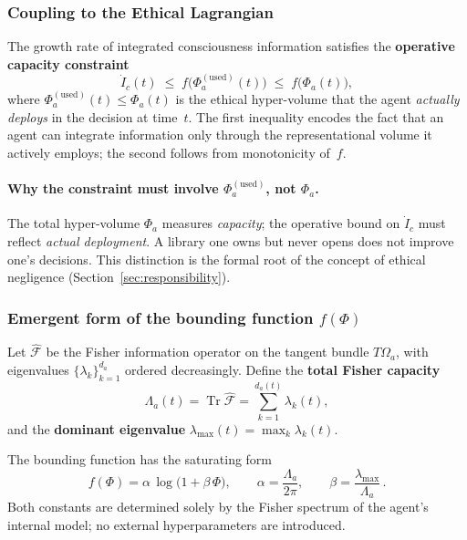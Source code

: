 \subsubsection{Coupling to the Ethical Lagrangian}
\label{sec:coupling}

The growth rate of integrated consciousness information satisfies the
\textbf{operative capacity constraint}
\begin{equation}
\label{eq:capacity-chain}
    \dot{I}_c(t)
    \;\leq\;
    f\!\bigl(\Phi_a^{(\mathrm{used})}(t)\bigr)
    \;\leq\;
    f\!\bigl(\Phi_a(t)\bigr),
\end{equation}
where $\Phi_a^{(\mathrm{used})}(t)\leq\Phi_a(t)$ is the ethical hyper-volume
that the agent \emph{actually deploys} in the decision at time~$t$.
The first inequality encodes the fact that an agent can integrate
information only through the representational volume it actively
employs; the second follows from monotonicity of~$f$.

\paragraph{Why the constraint must involve $\Phi_a^{(\mathrm{used})}$, not $\Phi_a$.}
The total hyper-volume $\Phi_a$ measures \emph{capacity};
the operative bound on $\dot{I}_c$ must reflect \emph{actual deployment}.
A library one owns but never opens does not improve one's decisions.
This distinction is the formal root of the concept of ethical negligence
(Section~\ref{sec:responsibility}).

\subsubsection{Emergent form of the bounding function $f(\Phi)$}
\label{sec:f-derivation}

Let $\hat{\mathcal{F}}$ be the Fisher information operator on the
tangent bundle $T\Omega_a$, with eigenvalues $\{\lambda_k\}_{k=1}^{d_a}$
ordered decreasingly.  Define the \textbf{total Fisher capacity}
\begin{equation}
    \Lambda_a(t)=\operatorname{Tr}\hat{\mathcal{F}}
    =\sum_{k=1}^{d_a(t)}\lambda_k(t),
\end{equation}
and the \textbf{dominant eigenvalue} $\lambda_{\max}(t)=\max_k\lambda_k(t)$.

\begin{proposition}
\label{prop:f-form}
The bounding function has the saturating form
\begin{equation}
\label{eq:f-form}
\boxed{\;
    f(\Phi)=\alpha\,\log\!\bigl(1+\beta\,\Phi\bigr),
    \qquad
    \alpha=\frac{\Lambda_a}{2\pi},
    \qquad
    \beta=\frac{\lambda_{\max}}{\Lambda_a}\,.
\;}
\end{equation}
Both constants are determined solely by the Fisher spectrum of the
agent's internal model; no external hyperparameters are introduced.
\end{proposition}

